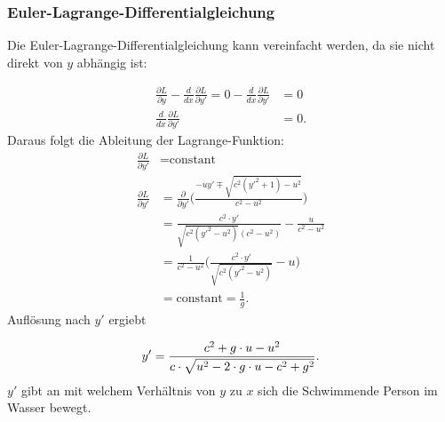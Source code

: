 \subsubsection{Euler-Lagrange-Differentialgleichung} Die Euler-Lagrange-Differentialgleichung kann vereinfacht werden, da sie nicht direkt von \(y\) abhängig ist:

\begin{align}
    \frac{\partial L}{\partial y} - \frac{d}{dx}\frac{\partial L}{\partial y'} = 0 - \frac{d}{dx}\frac{\partial L}{\partial y'} &= 0 \\
    \frac{d}{dx}\frac{\partial L}{\partial y'} &= 0.
\end{align}
Daraus folgt die Ableitung der Lagrange-Funktion:
\begin{align}
    \frac{\partial L}{\partial y'} &= \text{constant} \label{eq:Lagrange_derivites_1}\\
    \frac{\partial L}{\partial y'} &= \frac{\partial}{\partial y'} \biggl (\frac{-uy' \mp \sqrt{c^2(y'^2+1)-u^2}}{c^2-u^2}\biggr) \\
    &= \frac{c^2\cdot y'}{\sqrt{c^2(y'^2-u^2)}(c^2-u^2)} - \frac{u}{c^2-u^2} \\
    &=  \frac{1}{c^2-u^2} \biggl( \frac{c^2\cdot y'}{\sqrt{c^2(y'^2-u^2)}} - u \biggr ) \\
    &= \text{constant} = \frac{1}{g}.\label{eq:Lagrange_derivites_2}
\end{align}
Auflösung nach \(y'\) ergiebt
   
\begin{equation}
    y' = \frac{c^2 + g\cdot u - u^2}{c \cdot \sqrt{u^2-2\cdot g\cdot u - c^2 + g^2}} .\label{eq:angle} \\
\end{equation}
\(y'\) gibt an mit welchem Verhältnis von \(y\) zu \(x\) sich die Schwimmende Person im Wasser bewegt.

































